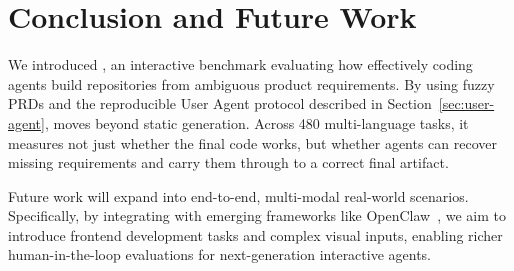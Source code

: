 




\section{Conclusion and Future Work}
\label{sec:conclusion}

We introduced \rcb{}, an interactive benchmark evaluating how effectively coding agents build repositories from ambiguous product requirements. By using fuzzy PRDs and the reproducible User Agent protocol described in Section~\ref{sec:user-agent}, \rcb{} moves beyond static generation. Across 480 multi-language tasks, it measures not just whether the final code works, but whether agents can recover missing requirements and carry them through to a correct final artifact.

Future work will expand \rcb{} into end-to-end, multi-modal real-world scenarios. Specifically, by integrating with emerging frameworks like OpenClaw~\cite{openclaw2026}, we aim to introduce frontend development tasks and complex visual inputs, enabling richer human-in-the-loop evaluations for next-generation interactive agents.
